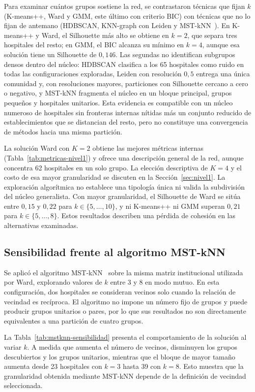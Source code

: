 Para examinar cuántos grupos sostiene la red, se contrastaron
técnicas que fijan $k$ (K-means++, Ward y GMM, este último con criterio BIC)
con técnicas que no lo fijan de antemano (HDBSCAN, KNN-graph con Leiden y
MST-kNN~\citep{Villalobos2016}). En K-means++ y Ward, el Silhouette más alto
se obtiene en $k = 2$, que separa tres hospitales del resto; en GMM, el BIC
alcanza su mínimo en $k = 4$, aunque esa solución tiene un Silhouette de
$0{,}146$. Las segundas no identifican subgrupos densos
dentro del núcleo: HDBSCAN clasifica a los 65 hospitales como ruido en todas
las configuraciones exploradas, Leiden con resolución $0{,}5$ entrega una
única comunidad y, con resoluciones mayores, particiones con Silhouette cercano
a cero o negativo, y MST-kNN fragmenta el núcleo en un bloque principal,
grupos pequeños y hospitales unitarios. Esta evidencia es compatible con un
núcleo numeroso de hospitales sin fronteras internas nítidas más un conjunto
reducido de establecimientos que se distancian del resto, pero no constituye
una convergencia de métodos hacia una misma partición.

La solución Ward con $K=2$ obtiene las mejores métricas internas
(Tabla~\ref{tab:metricas-nivel1}) y ofrece una descripción general de la red,
aunque concentra 62 hospitales en un solo grupo. La elección descriptiva de
$K=4$ y el costo de esa mayor granularidad se discuten en la
Sección~\ref{sec:nivel1}. La exploración algorítmica no establece una tipología
única ni valida la subdivisión del núcleo generalista. Con mayor granularidad,
el Silhouette de Ward se sitúa entre $0{,}15$ y $0{,}22$ para
$k\in\{5,\ldots,10\}$, y ni K-means++ ni GMM superan $0{,}21$
para $k\in\{5,\ldots,8\}$. Estos resultados describen una pérdida
de cohesión en las alternativas examinadas.

\subsection*{Sensibilidad frente al algoritmo MST-kNN}

Se aplicó el algoritmo MST-kNN~\citep{inostroza2008} sobre la misma matriz institucional utilizada por Ward, explorando valores de $k$ entre 3 y 8 en modo mutuo. En esta configuración, dos hospitales se consideran vecinos solo cuando la relación de vecindad es recíproca. El algoritmo no impone un número fijo de grupos y puede producir grupos unitarios o pares, por lo que sus resultados no son directamente equivalentes a una partición de cuatro grupos.

La Tabla~\ref{tab:mstknn-sensibilidad} presenta el comportamiento de la solución al variar $k$. A medida que aumenta el número de vecinos, disminuyen los grupos descubiertos y los grupos unitarios, mientras que el bloque de mayor tamaño aumenta desde 23 hospitales con $k=3$ hasta 39 con $k=8$. Esto muestra que la granularidad obtenida mediante MST-kNN depende de la definición de vecindad seleccionada.

